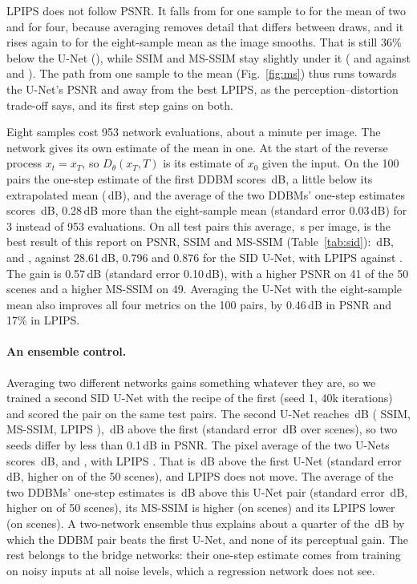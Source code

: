 LPIPS does not follow PSNR. It falls from \MSSINGLELPIPS{} for one sample to \MSTWOLPIPS{} for the mean of two and \MSFOURLPIPS{} for four, because averaging removes detail that differs between draws, and it rises again to \MSEIGHTLPIPS{} for the eight-sample mean as the image smooths. That is still 36\% below the U-Net (\MSUNETLPIPS), while SSIM and MS-SSIM stay slightly under it (\MSEIGHTSSIM{} and \MSEIGHTMS{} against \MSUNETSSIM{} and \MSUNETMS). The path from one sample to the mean (Fig.~\ref{fig:ms}) thus runs towards the U-Net's PSNR and away from the best LPIPS, as the perception--distortion trade-off says, and its first step gains on both.

Eight samples cost 953 network evaluations, about a minute per image. The network gives its own estimate of the mean in one. At the start of the reverse process $x_t=x_T$, so $D_\theta(x_T,T)$ is its estimate of $x_0$ given the input. On the 100 pairs the one-step estimate of the first DDBM scores \MSSTEPPSNR\,dB, a little below its extrapolated mean (\MSINFNAIVE\,dB), and the average of the two DDBMs' one-step estimates scores \MSSTEPAVGPSNR\,dB, 0.28\,dB more than the eight-sample mean (standard error 0.03\,dB) for 3 instead of 953 evaluations. On all \SIDTESTPAIRS{} test pairs this average, \TSTEPAVG\,s per image, is the best result of this report on PSNR, SSIM and MS-SSIM (Table~\ref{tab:sid}): \STEPAVGPSNR\,dB, \STEPAVGSSIM{} and \STEPAVGMS{}, against 28.61\,dB, 0.796 and 0.876 for the SID U-Net, with LPIPS \STEPAVGLPIPS{} against \SIDRELPIPS{}. The gain is 0.57\,dB (standard error 0.10\,dB), with a higher PSNR on 41 of the 50 scenes and a higher MS-SSIM on 49. Averaging the U-Net with the eight-sample mean also improves all four metrics on the 100 pairs, by 0.46\,dB in PSNR and 17\% in LPIPS.

\paragraph{An ensemble control.} Averaging two different networks gains something whatever they are, so we trained a second SID U-Net with the recipe of the first (seed 1, 40k iterations) and scored the pair on the same \SIDTESTPAIRS{} test pairs. The second U-Net reaches \UBPSNR\,dB (\UBSSIM{} SSIM, \UBMS{} MS-SSIM, LPIPS \UBLPIPS), \GBA\,dB above the first (standard error \GBASE\,dB over scenes), so two seeds differ by less than 0.1\,dB in PSNR. The pixel average of the two U-Nets scores \UABPSNR\,dB, \UABSSIM{} and \UABMS{}, with LPIPS \UABLPIPS{}. That is \GABA\,dB above the first U-Net (standard error \GABASE\,dB, higher on \GABAWIN{} of the 50 scenes), and LPIPS does not move. The average of the two DDBMs' one-step estimates is \GDDAB\,dB above this U-Net pair (standard error \GDDABSE\,dB, higher on \GDDABWIN{} of 50 scenes), its MS-SSIM is \GDDABMS{} higher (on \GDDABMSWIN{} scenes) and its LPIPS \GDDABLPIPS{} lower (on \GDDABLPIPSWIN{} scenes). A two-network ensemble thus explains about a quarter of the \GDDA\,dB by which the DDBM pair beats the first U-Net, and none of its perceptual gain. The rest belongs to the bridge networks: their one-step estimate comes from training on noisy inputs at all noise levels, which a regression network does not see.

